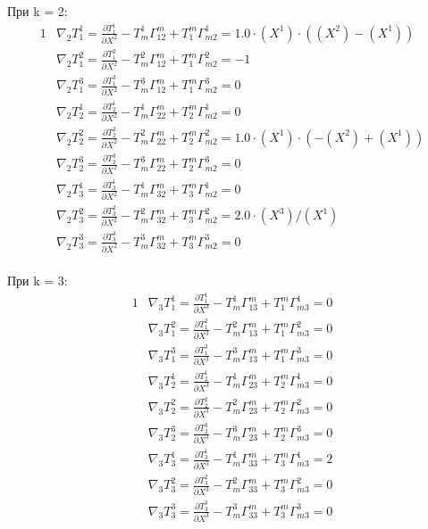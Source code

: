 \documentclass[a4paper, 12pt, oneside]{article}
\begin{document}
При k = 2:\\
\begin{alignat*}{1}
  & \nabla_2T^1_1 = \frac{\partial T^1_1}{\partial X^2} - T^1_m\Gamma^m_{12} + T^m_1\Gamma^1_{m2} = 1.0\cdot (X^1)\cdot ((X^2) - (X^1)) \\
  & \nabla_2T^2_1 = \frac{\partial T^2_1}{\partial X^2} - T^2_m\Gamma^m_{12} + T^m_1\Gamma^2_{m2} = -1 \\
  & \nabla_2T^3_1 = \frac{\partial T^3_1}{\partial X^2} - T^3_m\Gamma^m_{12} + T^m_1\Gamma^3_{m2} = 0 \\
  & \nabla_2T^1_2 = \frac{\partial T^1_2}{\partial X^2} - T^1_m\Gamma^m_{22} + T^m_2\Gamma^1_{m2} = 0 \\
  & \nabla_2T^2_2 = \frac{\partial T^2_2}{\partial X^2} - T^2_m\Gamma^m_{22} + T^m_2\Gamma^2_{m2} = 1.0\cdot (X^1)\cdot (-(X^2) + (X^1)) \\
  & \nabla_2T^3_2 = \frac{\partial T^3_2}{\partial X^2} - T^3_m\Gamma^m_{22} + T^m_2\Gamma^3_{m2} = 0 \\
  & \nabla_2T^1_3 = \frac{\partial T^1_3}{\partial X^2} - T^1_m\Gamma^m_{32} + T^m_3\Gamma^1_{m2} = 0 \\
  & \nabla_2T^2_3 = \frac{\partial T^2_3}{\partial X^2} - T^2_m\Gamma^m_{32} + T^m_3\Gamma^2_{m2} = 2.0\cdot (X^3)/(X^1) \\
  & \nabla_2T^3_3 = \frac{\partial T^3_3}{\partial X^2} - T^3_m\Gamma^m_{32} + T^m_3\Gamma^3_{m2} = 0 
\end{alignat*}\\
При k = 3:\\
\begin{alignat*}{1}
  & \nabla_3T^1_1 = \frac{\partial T^1_1}{\partial X^3} - T^1_m\Gamma^m_{13} + T^m_1\Gamma^1_{m3} = 0 \\
  & \nabla_3T^2_1 = \frac{\partial T^2_1}{\partial X^3} - T^2_m\Gamma^m_{13} + T^m_1\Gamma^2_{m3} = 0 \\
  & \nabla_3T^3_1 = \frac{\partial T^3_1}{\partial X^3} - T^3_m\Gamma^m_{13} + T^m_1\Gamma^3_{m3} = 0 \\
  & \nabla_3T^1_2 = \frac{\partial T^1_2}{\partial X^3} - T^1_m\Gamma^m_{23} + T^m_2\Gamma^1_{m3} = 0 \\
  & \nabla_3T^2_2 = \frac{\partial T^2_2}{\partial X^3} - T^2_m\Gamma^m_{23} + T^m_2\Gamma^2_{m3} = 0 \\
  & \nabla_3T^3_2 = \frac{\partial T^3_2}{\partial X^3} - T^3_m\Gamma^m_{23} + T^m_2\Gamma^3_{m3} = 0 \\
  & \nabla_3T^1_3 = \frac{\partial T^1_3}{\partial X^3} - T^1_m\Gamma^m_{33} + T^m_3\Gamma^1_{m3} = 2 \\
  & \nabla_3T^2_3 = \frac{\partial T^2_3}{\partial X^3} - T^2_m\Gamma^m_{33} + T^m_3\Gamma^2_{m3} = 0 \\
  & \nabla_3T^3_3 = \frac{\partial T^3_3}{\partial X^3} - T^3_m\Gamma^m_{33} + T^m_3\Gamma^3_{m3} = 0 
\end{alignat*}\\
\end{document}

